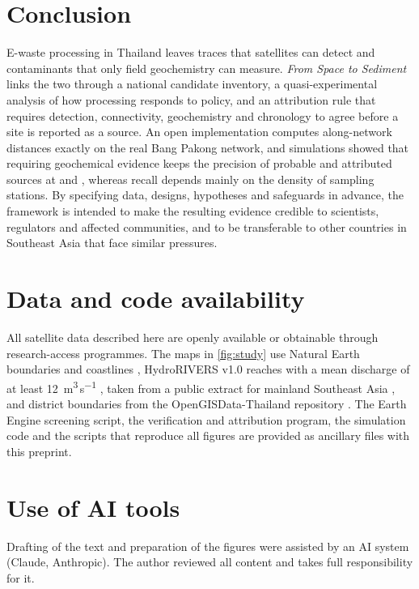 \documentclass[10pt]{article}
\begin{document}
\section{Conclusion}\label{sec:conclusion}
E-waste processing in Thailand leaves traces that satellites can detect and contaminants that only field geochemistry can measure. \emph{From Space to Sediment} links the two through a national candidate inventory, a quasi-experimental analysis of how processing responds to policy, and an attribution rule that requires detection, connectivity, geochemistry and chronology to agree before a site is reported as a source. An open implementation computes along-network distances exactly on the real Bang Pakong network, and simulations showed that requiring geochemical evidence keeps the precision of probable and attributed sources at \rngPrecStrict{} and \rngPrecAttributed{}, whereas recall depends mainly on the density of sampling stations. By specifying data, designs, hypotheses and safeguards in advance, the framework is intended to make the resulting evidence credible to scientists, regulators and affected communities, and to be transferable to other countries in Southeast Asia that face similar pressures.

\section*{Data and code availability}
All satellite data described here are openly available or obtainable through research-access programmes. The maps in \cref{fig:study} use Natural Earth boundaries and coastlines \citep{naturalearth}, HydroRIVERS v1.0 reaches with a mean discharge of at least 12~m\textsuperscript{3}\,s\textsuperscript{$-1$} \citep{lehner2013}, taken from a public extract for mainland Southeast Asia \citep{waterways}, and district boundaries from the OpenGISData-Thailand repository \citep{opengis}. The Earth Engine screening script, the verification and attribution program, the simulation code and the scripts that reproduce all figures are provided as ancillary files with this preprint.

\section*{Use of AI tools}
Drafting of the text and preparation of the figures were assisted by an AI system (Claude, Anthropic). The author reviewed all content and takes full responsibility for it.



\end{document}
